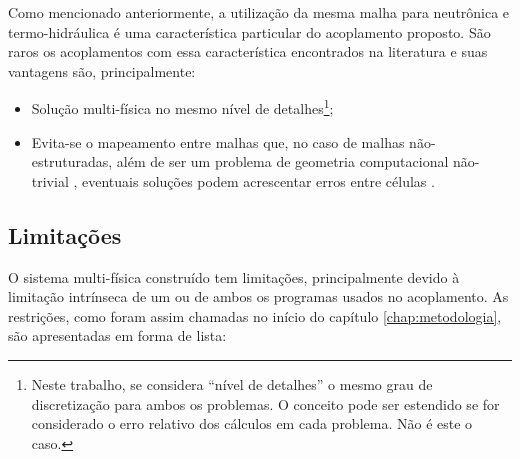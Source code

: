 Como mencionado anteriormente, a utilização da mesma malha para neutrônica e
termo-hidráulica é uma característica
particular do acoplamento proposto. São raros os acoplamentos com essa característica
encontrados na literatura \cite{Jareteg2014} e suas vantagens são, principalmente:

\begin{itemize}
\item Solução multi-física no mesmo nível de detalhes\footnote{Neste trabalho, se considera ``nível de detalhes'' o
  mesmo grau de discretização para ambos os problemas. O conceito pode ser estendido se for
  considerado o erro relativo dos cálculos em cada problema. Não é este o caso.};
\item Evita-se o mapeamento entre malhas que, no caso de malhas não-estruturadas, além de ser um problema de
  geometria computacional não-trivial , eventuais soluções podem acrescentar
  erros entre células \cite{Kraevoy2004}.
\end{itemize}

\subsection{Limitações}
\label{subsec:lim}

O sistema multi-física construído tem limitações, principalmente devido à limitação intrínseca de um ou de ambos
os programas usados no acoplamento. As restrições, como foram assim chamadas no início do capítulo
\ref{chap:metodologia}, são apresentadas
em forma de lista:

